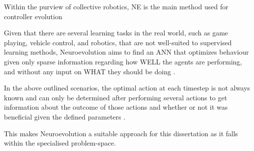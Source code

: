 Within the purview of collective robotics, NE is the main method used for controller evolution


Given that there are several learning tasks in the real world, such as game playing, vehicle control, and robotics, that are not well-suited to supervised learning methods, Neuroevolution aims to find an ANN that optimizes behaviour given only sparse information regarding how WELL the agents are performing, and without any input on WHAT they should be doing \cite{Miikkulainen2010}. 

In the above outlined scenarios, the optimal action at each timestep is not always known and can only be determined after performing several actions to get information about the outcome of those actions and whether or not it was beneficial given the defined parameters \cite{Miikkulainen2010}.

This makes Neuroevolution a suitable approach for this dissertation as it falls within the specialised problem-space.





